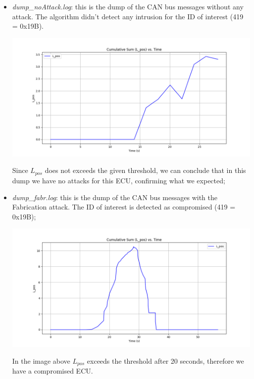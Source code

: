 \documentclass[12pt]{article}
\begin{document}
\begin{itemize}
    \item \textit{dump\_noAttack.log}: this is the dump of the CAN bus messages without any attack. The algorithm 
    didn't detect any intrusion for the ID of interest (419 = 0x19B).
    \begin{center}
        \vspace{-1cm}
        \hspace*{-2cm}
        \includegraphics[scale=0.5]{img/LposNoAttack.png}
    \end{center}
    Since $L_{pos}$ does not exceeds the given threshold, 
    we can conclude that in this dump we have no attacks for this ECU, confirming what we expected;
    \item \textit{dump\_fabr.log}: this is the dump of the CAN bus messages with the Fabrication attack. The ID 
    of interest is detected as compromised (419 = 0x19B);
    \begin{center}
        \vspace{-1cm}
        \hspace*{-2cm}
        \includegraphics[scale=0.5]{img/LposFabr.png}
    \end{center}
    In the image above $L_{pos}$ exceeds the threshold after 20 seconds, therefore we have a compromised ECU. 

\end{itemize}
\end{document}
